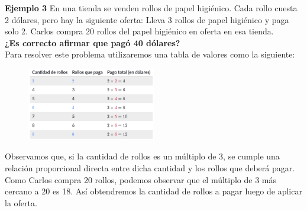 
{\color{brown}\textbf{Ejemplo 3}}
En una tienda se venden rollos de papel higiénico. Cada rollo cuesta 2 dólares, pero hay la siguiente oferta:
Lleva 3 rollos de papel higiénico y paga solo 2.
Carlos compra 20 rollos del papel higiénico en oferta en esa tienda.\\
\textbf{¿Es correcto afirmar que pagó 40 dólares?}\\

Para resolver este problema utilizaremos una tabla de valores como la siguiente:




\begin{figure}[H]
    \centering
    \includegraphics[width=0.5\textwidth]{./Unidad 2/Images/tableS8L102.png}
\end{figure}

Observamos que, si la cantidad de rollos es un múltiplo de 3, se cumple una relación proporcional
directa entre dicha cantidad y los rollos que deberá pagar. Como Carlos compra 20 rollos, podemos
observar que el múltiplo de 3 más cercano a 20 es 18. Así obtendremos la cantidad de rollos a pagar
luego de aplicar la oferta.\\

